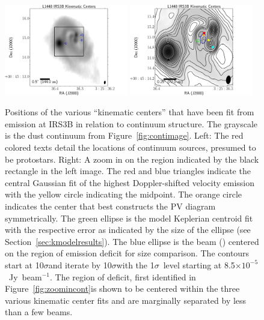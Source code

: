 \begin{figure}[H]
\begin{center}
   \includegraphics[width=0.48\textwidth]{img/L1448IRS3B_cont_robust05kincenters.pdf} %
   \includegraphics[width=0.48\textwidth]{img/L1448IRS3B_cont_robust05kincenters_zoom.pdf} %
\end{center}
   \caption{Positions of the various ``kinematic centers'' that have been fit from \cso\space emission at IRS3B in relation to continuum structure. The grayscale is the dust continuum from Figure~\ref{fig:contimage}. Left: The red colored texts detail the locations of continuum sources, presumed to be protostars. Right: A zoom in on the region indicated by the black rectangle in the left image. The red and blue triangles indicate the central Gaussian fit of the highest Doppler-shifted velocity emission with the yellow circle indicating the midpoint. The orange circle indicates the center that best constructs the PV diagram symmetrically. The green ellipse is the model Keplerian centroid fit with the respective error as indicated by the size of the ellipse (see Section~\ref{sec:kmodelresults}). The blue ellipse is the \cso\space beam (\csobeam) centered on the region of emission deficit for size comparison. The contours start at 10$\sigma$\space and iterate by 10$\sigma$\space with the 1$\sigma$~level starting at 8.5$\times10^{-5}$~Jy~beam$^{-1}$. The region of deficit, first identified in Figure~\ref{fig:zoomincont}\space is shown to be centered within the three various kinematic center fits and are marginally separated by less than a few beams.}\label{fig:kincenter}
\end{figure}



